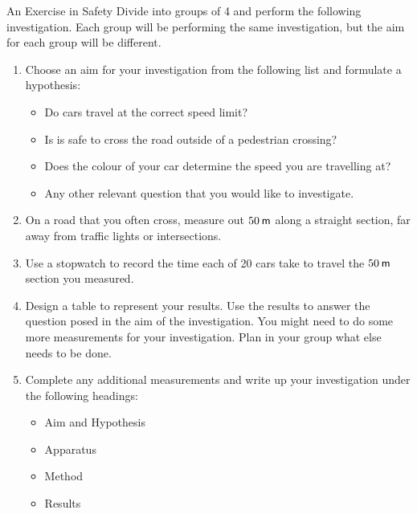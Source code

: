 \begin{Investigation}{An Exercise in Safety }
            \nopagebreak
        \label{m38791*id67213}Divide into groups of 4 and perform the following investigation. Each group will be performing the same investigation, but the aim for each group will be different.\par 
        \label{m38791*id67220}\begin{enumerate}[noitemsep, label=\textbf{\arabic*}. ] 
            \label{m38791*uid57}\item Choose an aim for your investigation from the following list and formulate a hypothesis:
\label{m38791*id67236}\begin{itemize}[noitemsep]
            \label{m38791*uid58}\item Do cars travel at the correct speed limit?
\label{m38791*uid59}\item Is is safe to cross the road outside of a pedestrian crossing?
\label{m38791*uid60}\item Does the colour of your car determine the speed you are travelling at?
\label{m38791*uid61}\item Any other relevant question that you would like to investigate.
\end{itemize}
        \label{m38791*uid62}\item On a road that you often cross, measure out $50\phantom{\rule{2pt}{0ex}}\mathsf{m}$ along a straight section, far away from traffic lights or intersections.
\label{m38791*uid63}\item Use a stopwatch to record the time each of 20 cars take to travel the $50\phantom{\rule{2pt}{0ex}}\mathsf{m}$ section you measured.
\label{m38791*uid64}\item Design a table to represent your results. Use the results to answer the question posed in the aim of the investigation. You might need to do some more measurements for your investigation. Plan in your group what else needs to be done.
\label{m38791*uid65}\item Complete any additional measurements and write up your investigation under the following headings:
\label{m38791*id67343}\begin{itemize}[noitemsep]
            \label{m38791*uid66}\item Aim and Hypothesis
\label{m38791*uid67}\item Apparatus
\label{m38791*uid68}\item Method
\label{m38791*uid69}\item Results

\end{itemize}
\end{enumerate}
\end{Investigation}
